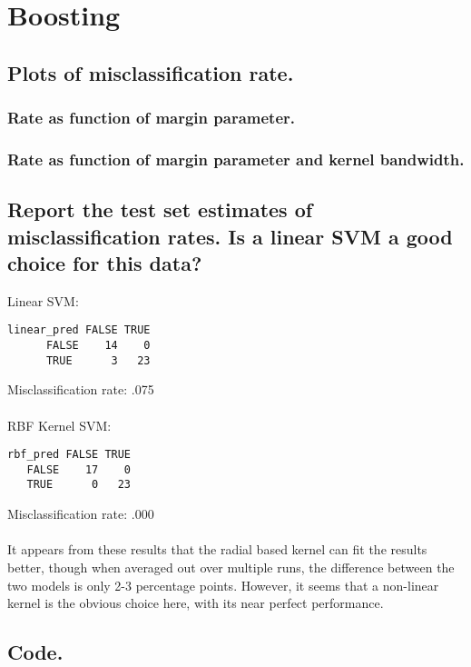 \documentclass[11pt]{article}
\theoremstyle{quest}
\newcommand{\problem}[1]{\section{#1}}        %
\newcommand{\subproblem}[1]{\subsection{#1}}      %
\newcommand{\subsubproblem}[1]{\subsubsection{#1}}      %
\begin{document}
\vspace{1em}
\problem{Boosting}

\subproblem{Plots of misclassification rate.}
\subsubproblem{Rate as function of margin parameter.}
\begin{center}
\end{center}


\subsubproblem{Rate as function of margin parameter and kernel bandwidth.}
\begin{center}
\end{center}

\subproblem{Report the test set estimates of misclassification rates. Is a linear SVM a good choice for this data?}
       
\begin{adjustwidth}{3.5em}{0em}  
Linear SVM:
\begin{lstlisting}  
linear_pred FALSE TRUE
      FALSE    14    0
      TRUE      3   23
\end{lstlisting}
Misclassification rate: .075
\\\\
RBF Kernel SVM:
\begin{lstlisting}
rbf_pred FALSE TRUE
   FALSE    17    0
   TRUE      0   23
\end{lstlisting}
Misclassification rate: .000
\\\\
It appears from these results that the radial based kernel can fit the results better, though when averaged out over multiple runs, the difference between the two models is only 2-3 percentage points. However, it seems that a non-linear kernel is the obvious choice here, with its near perfect performance.

\end{adjustwidth}

\subproblem{Code.}
\end{document}
